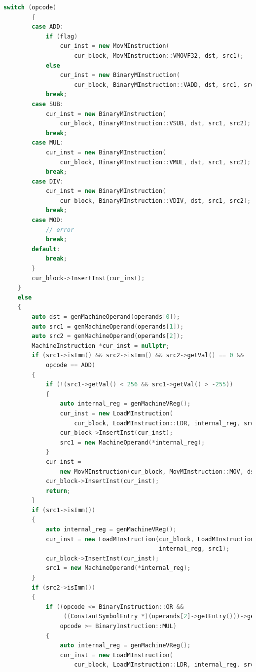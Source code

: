 \documentclass[UTF8,a4paper,10pt]{ctexart}
\begin{document}
\begin{lstlisting}[title = 生成目标代码, language = c++]
        switch (opcode)
        {
        case ADD:
            if (flag)
                cur_inst = new MovMInstruction(
                    cur_block, MovMInstruction::VMOVF32, dst, src1);
            else
                cur_inst = new BinaryMInstruction(
                    cur_block, BinaryMInstruction::VADD, dst, src1, src2);
            break;
        case SUB:
            cur_inst = new BinaryMInstruction(
                cur_block, BinaryMInstruction::VSUB, dst, src1, src2);
            break;
        case MUL:
            cur_inst = new BinaryMInstruction(
                cur_block, BinaryMInstruction::VMUL, dst, src1, src2);
            break;
        case DIV:
            cur_inst = new BinaryMInstruction(
                cur_block, BinaryMInstruction::VDIV, dst, src1, src2);
            break;
        case MOD:
            // error
            break;
        default:
            break;
        }
        cur_block->InsertInst(cur_inst);
    }
    else
    {
        auto dst = genMachineOperand(operands[0]);
        auto src1 = genMachineOperand(operands[1]);
        auto src2 = genMachineOperand(operands[2]);
        MachineInstruction *cur_inst = nullptr;
        if (src1->isImm() && src2->isImm() && src2->getVal() == 0 &&
            opcode == ADD)
        {
            if (!(src1->getVal() < 256 && src1->getVal() > -255))
            {
                auto internal_reg = genMachineVReg();
                cur_inst = new LoadMInstruction(
                    cur_block, LoadMInstruction::LDR, internal_reg, src1);
                cur_block->InsertInst(cur_inst);
                src1 = new MachineOperand(*internal_reg);
            }
            cur_inst =
                new MovMInstruction(cur_block, MovMInstruction::MOV, dst, src1);
            cur_block->InsertInst(cur_inst);
            return;
        }
        if (src1->isImm())
        {
            auto internal_reg = genMachineVReg();
            cur_inst = new LoadMInstruction(cur_block, LoadMInstruction::LDR,
                                            internal_reg, src1);
            cur_block->InsertInst(cur_inst);
            src1 = new MachineOperand(*internal_reg);
        }
        if (src2->isImm())
        {
            if ((opcode <= BinaryInstruction::OR &&
                 ((ConstantSymbolEntry *)(operands[2]->getEntry()))->getValue() > 255) ||
                opcode >= BinaryInstruction::MUL)
            {
                auto internal_reg = genMachineVReg();
                cur_inst = new LoadMInstruction(
                    cur_block, LoadMInstruction::LDR, internal_reg, src2);

\end{lstlisting}
\end{document}
